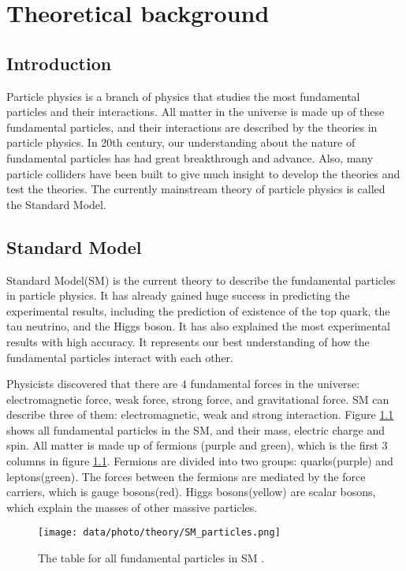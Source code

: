 \chapter{Theoretical background}
\label{ch:theory}

\section{Introduction}
Particle physics is a branch of physics that studies the most fundamental particles and their interactions.
All matter in the universe is made up of these fundamental particles, and their interactions are described by the theories in particle physics.
In 20th century, our understanding about the nature of fundamental particles has had great breakthrough and  advance.
Also, many particle colliders have been built to give much insight to develop the theories and test the theories.
The currently mainstream theory of particle physics is called the Standard Model.

\section{Standard Model}
\label{sec:Standard_Model}
Standard Model(SM) is the current theory to describe the fundamental particles in particle physics.
It has already gained huge success in predicting the experimental results, including the prediction of existence of the top quark, the tau neutrino, and the Higgs boson.
It has also explained the most experimental results with high accuracy.
It represents our best understanding of how the fundamental particles interact with each other.

Physicists discovered that there are 4 fundamental forces in the universe: electromagnetic force, weak force, strong force, and gravitational force.
SM can describe three of them: electromagnetic, weak and strong interaction.
Figure \ref{fig:SM_particles} shows all fundamental particles in the SM, and their mass, electric charge and spin.
All matter is made up of fermions (purple and green), which is the first 3 columns in figure \ref{fig:SM_particles}.
Fermions are divided into two groups: quarks(purple) and leptons(green).
The forces between the fermions are mediated by the force carriers, which is gauge bosons(red).
Higgs bosons(yellow) are scalar bosons, which explain the masses of other massive particles.

\begin{figure}
\centering
\texttt{[image: data/photo/theory/SM\_particles.png]}
\caption{The table for all fundamental particles in SM \cite{SM_particles}.}
\label{fig:SM_particles}
\end{figure}

